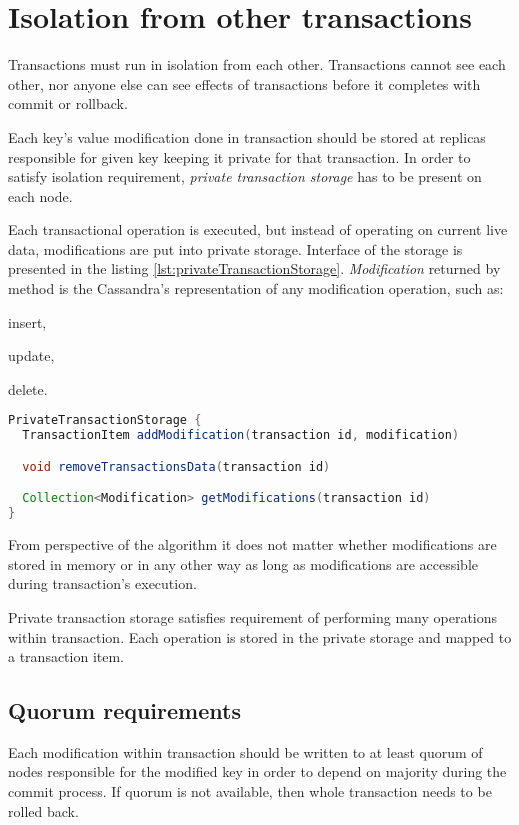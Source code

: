 
\section{Isolation from other transactions}
Transactions must run in isolation from each other. Transactions cannot see each other, nor anyone else can see effects of transactions before it completes with commit or rollback.

Each key's value modification done in transaction should be stored at replicas responsible for given key keeping it private for that transaction. In order to satisfy isolation requirement, \emph{private transaction storage} has to be present on each node.

Each transactional operation is executed, but instead of operating on current live data, modifications are put into private storage. Interface of the storage is presented in the listing \ref{lst:privateTransactionStorage}. \emph{Modification} returned by  method is the Cassandra's representation of any modification operation, such as: \begin{enumerate*} \item insert, \item update, \item delete. \end{enumerate*}

\begin{lstlisting}[language=Java,style=outcode,label={lst:privateTransactionStorage},caption={API of private transaction storage}]
PrivateTransactionStorage {
  TransactionItem addModification(transaction id, modification)

  void removeTransactionsData(transaction id)

  Collection<Modification> getModifications(transaction id)        
}

\end{lstlisting}


From perspective of the algorithm it does not matter whether modifications are stored in memory or in any other way as long as modifications are accessible during transaction's execution.

Private transaction storage satisfies requirement of performing many operations within transaction. Each operation is stored in the private storage and mapped to a transaction item.


\subsection{Quorum requirements}
Each modification within transaction should be written to at least quorum of nodes responsible for the modified key in order to depend on majority during the commit process. If quorum is not available, then whole transaction needs to be rolled back. 

